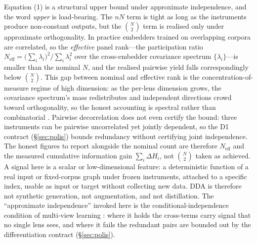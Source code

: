 \documentclass[10pt,twocolumn]{article}
\begin{document}
Equation (1) is a structural upper bound under approximate independence, and the
word \emph{upper} is load-bearing. The $nN$ term is tight as long as the
instruments produce non-constant outputs, but the $\binom{N}{2}$ term is realised
only under approximate orthogonality. In practice embedders trained on overlapping
corpora are correlated, so the \emph{effective} panel rank---the participation
ratio $N_{\mathrm{eff}}=\bigl(\sum_i\lambda_i\bigr)^2/\sum_i\lambda_i^2$ over the
cross-embedder covariance spectrum $\{\lambda_i\}$---is smaller than the nominal
$N$, and the realised pairwise yield falls correspondingly below $\binom{N}{2}$.
This gap between nominal and effective rank is the concentration-of-measure regime
of high dimension: as the per-lens dimension grows, the covariance spectrum's mass
redistributes and independent directions crowd toward orthogonality, so the honest
accounting is spectral rather than combinatorial
\citep{vershynin2018hdp,gorban2018blessing}.
Pairwise decorrelation does not even certify the bound: three instruments can be
pairwise uncorrelated yet jointly dependent, so the D1 contract
(\S\ref{sec:polis}) bounds redundancy without certifying joint independence. The
honest figures to report alongside the nominal count are therefore
$N_{\mathrm{eff}}$ and the measured cumulative information gain
$\sum_i\Delta H_i$, not $\binom{N}{2}$ taken as achieved. A signal here is a
scalar or low-dimensional feature: a deterministic function of a real input or
fixed-corpus graph under frozen instruments, attached to a specific index, usable
as input or target without collecting new data. DDA is therefore not synthetic
generation, not augmentation, and not distillation. The
``approximate independence'' invoked here is the conditional-independence
condition of multi-view learning \citep{blum1998cotraining}: where it holds the
cross-terms carry signal that no single lens sees, and where it fails the
redundant pairs are bounded out by the differentiation contract
(\S\ref{sec:polis}).
\end{document}
